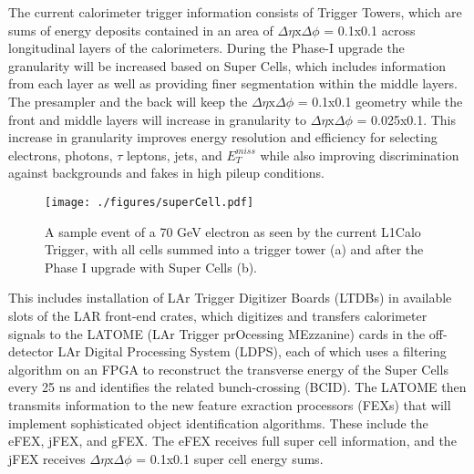 The current calorimeter trigger information consists of Trigger Towers, which are sums of energy deposits contained in an area of $\Delta\eta \mathrm{x} \Delta\phi$ = 0.1x0.1 across longitudinal layers of the calorimeters.  During the Phase-I upgrade the granularity will be increased based on Super Cells, which includes information from each layer as well as providing finer segmentation within the middle layers.  The presampler and the back will keep the $\Delta\eta \mathrm{x} \Delta\phi$ = 0.1x0.1 geometry while the front and middle layers will increase in granularity to $\Delta\eta \mathrm{x} \Delta\phi$ = 0.025x0.1.  This increase in granularity improves energy resolution and efficiency for selecting electrons, photons, $\tau$ leptons, jets, and $E_{T}^{miss}$ while also improving discrimination against backgrounds and fakes in high pileup conditions.  

\begin{figure}[h!]
  \centering
	\texttt{[image: ./figures/superCell.pdf]}
\caption{\label{fig:superCell}{ A sample event of a 70 GeV electron as seen by the current L1Calo Trigger, with all cells summed into a trigger tower (a) and after the Phase I upgrade with Super Cells (b). }} %
\end{figure}


This includes installation of LAr Trigger Digitizer Boards (LTDBs) in available slots of the LAR front-end crates, which digitizes and transfers calorimeter signals to the LATOME (LAr Trigger prOcessing MEzzanine) cards in the off-detector LAr Digital Processing System (LDPS), each of which uses a filtering algorithm on an FPGA to reconstruct the transverse energy of the Super Cells every 25 ns and identifies the related bunch-crossing (BCID).  The LATOME then transmits information to the new feature exraction processors (FEXs) that will implement sophisticated object identification algorithms.  These include the eFEX, jFEX, and gFEX.  The eFEX receives full super cell information, and the jFEX receives $\Delta\eta \mathrm{x} \Delta\phi$ = 0.1x0.1 super cell energy sums.%

